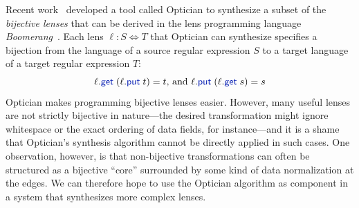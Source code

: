 \documentclass[acmsmall,screen]{acmart}
\newcommand{\kw}[1]{\textcolor{dkblue}{\ensuremath{\mathsf{#1}}}}
\newcommand{\get}{\ensuremath{\kw{get}}}
\newcommand{\lput}{\ensuremath{\kw{put}}}
\begin{document}
Recent work~\cite{miltner2017synthesizing} developed a tool called Optician to synthesize a
subset of the {\em bijective lenses} that can be derived in the lens
programming language {\em Boomerang}~\cite{boomerang}. Each lens $\ell : S
\Leftrightarrow T$ that Optician can synthesize specifies a bijection from the
language of a source regular expression $S$ to a target language of a target
regular expression $T$: \begin{equation}\label{bijectivelenslaws} \ell.\get \;
(\ell.\lput \; t) = t \text{, and } \ell.\lput \; (\ell.\get \; s) = s
\end{equation}
Optician makes programming bijective lenses easier.  However, many useful lenses
are not strictly bijective in nature---the desired transformation might ignore
whitespace or the exact ordering of data fields, for instance---and it is a
shame that Optician's synthesis algorithm cannot be directly applied in such
cases.  One observation, however, is that non-bijective transformations can
often be structured as a bijective ``core'' surrounded by some kind of data
normalization at the edges. We can therefore hope to use the Optician algorithm
as component in a system that synthesizes more complex lenses.
\end{document}
